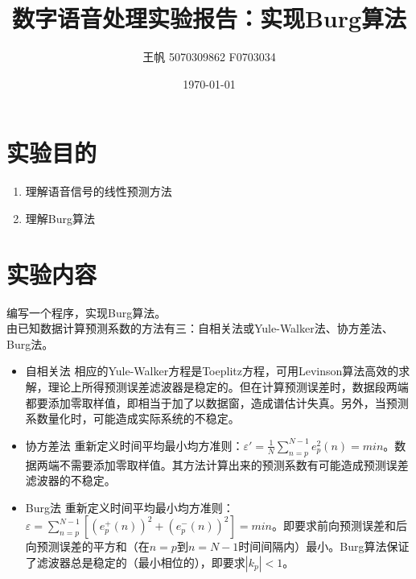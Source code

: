 \documentclass[11pt,a4paper]{ctexart}
\begin{document}
\title{\textbf{数字语音处理实验报告：实现Burg算法}}
\author{王帆  5070309862  F0703034}
\date{\today}
\maketitle

\section{实验目的}
\begin{enumerate}
\item{理解语音信号的线性预测方法}
\item{理解Burg算法}
\end{enumerate}

\section{实验内容}
编写一个程序，实现Burg算法。\\

由已知数据计算预测系数的方法有三：自相关法或Yule-Walker法、协方差法、Burg法。
\begin{itemize}
\item{自相关法} 相应的Yule-Walker方程是Toeplitz方程，可用Levinson算法高效的求解，理论上所得预测误差滤波器是稳定的。但在计算预测误差时，数据段两端都要添加零取样值，即相当于加了以数据窗，造成谱估计失真。另外，当预测系数量化时，可能造成实际系统的不稳定。
\item{协方差法} 重新定义时间平均最小均方准则：$\varepsilon' = \frac{1}{N} \sum^{N-1}_{n=p} e^{2}_{p}(n) = min$。数据两端不需要添加零取样值。其方法计算出来的预测系数有可能造成预测误差滤波器的不稳定。
\item{Burg法} 重新定义时间平均最小均方准则：$\varepsilon = \sum^{N-1}_{n=p}[(e^{+}_{p}(n))^{2}+(e^{-}_{p}(n))^{2}] = min$。即要求前向预测误差和后向预测误差的平方和（在$n=p$到$n=N-1$时间间隔内）最小。Burg算法保证了滤波器总是稳定的（最小相位的），即要求$|k_{p}|<1$。
\end{itemize}
\end{document}
